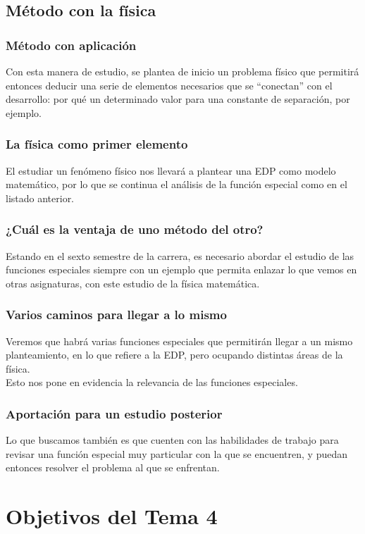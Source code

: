 \documentclass[12pt]{beamer}
\begin{document}
\subsection{Método con la física}

\begin{frame}
\frametitle{Método con aplicación}
Con esta manera de estudio, se plantea de inicio un problema físico que permitirá entonces deducir una serie de elementos necesarios que se \enquote{conectan} con el desarrollo: por qué un determinado valor para una constante de separación, por ejemplo.
\end{frame}
\begin{frame}
\frametitle{La física como primer elemento}
El estudiar un fenómeno físico nos llevará a plantear una EDP como modelo matemático, por lo que se continua el análisis de la función especial como en el listado anterior.
\end{frame}
\begin{frame}
\frametitle{¿Cuál es la ventaja de uno método del otro?}
Estando en el sexto semestre de la carrera, es necesario abordar el estudio de las funciones especiales siempre con un ejemplo que permita enlazar lo que vemos en otras asignaturas, con este estudio de la física matemática.
\end{frame}
\begin{frame}
\frametitle{Varios caminos para llegar a lo mismo}
Veremos que habrá varias funciones especiales que permitirán llegar a un mismo planteamiento, en lo que refiere a la EDP, pero ocupando distintas áreas de la física.
\\
\bigskip
\pause
Esto nos pone en evidencia la relevancia de las funciones especiales.
\end{frame}
\begin{frame}
\frametitle{Aportación para un estudio posterior}
Lo que buscamos también es que cuenten con las habilidades de trabajo para revisar una función especial muy particular con la que se encuentren, y puedan entonces resolver el problema al que se enfrentan.
\end{frame}

\section{Objetivos del Tema 4}
\end{document}
